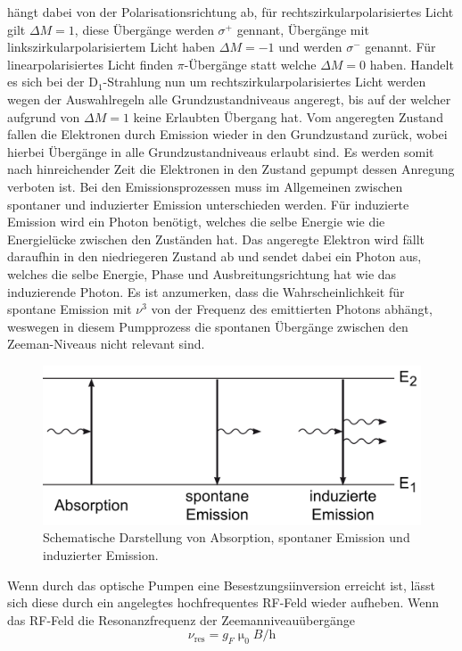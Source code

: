  hängt dabei von der Polarisationsrichtung ab, für rechtszirkularpolarisiertes Licht gilt $\Delta M=1$, diese Übergänge werden $\sigma^+$ gennant, Übergänge mit linkszirkularpolarisiertem Licht haben $\Delta M=-1$ und werden $\sigma^-$ genannt.
Für linearpolarisiertes Licht finden $\pi$-Übergänge statt welche $\Delta M=0$ haben. Handelt es sich bei der D$_1$-Strahlung nun um rechtszirkularpolarisiertes Licht werden wegen der Auswahlregeln alle Grundzustandniveaus angeregt, bis auf der welcher aufgrund von $\Delta M=1$ keine Erlaubten Übergang hat. Vom angeregten Zustand fallen die Elektronen durch Emission wieder in den Grundzustand zurück, wobei hierbei Übergänge in alle Grundzustandniveaus erlaubt sind. Es werden somit nach hinreichender Zeit die Elektronen in den Zustand gepumpt dessen Anregung verboten ist.
Bei den Emissionsprozessen muss im Allgemeinen zwischen spontaner und induzierter Emission unterschieden werden. Für induzierte Emission wird ein Photon benötigt, welches die selbe Energie wie die Energielücke zwischen den Zuständen hat. Das angeregte Elektron wird fällt daraufhin in den niedriegeren Zustand ab und sendet dabei ein Photon aus, welches die selbe Energie, Phase und Ausbreitungsrichtung hat wie das induzierende Photon.
Es ist anzumerken, dass die Wahrscheinlichkeit für spontane Emission mit $\nu^3$ von der Frequenz des emittierten Photons abhängt, weswegen in diesem Pumpprozess die spontanen Übergänge zwischen den Zeeman-Niveaus nicht relevant sind.
\begin{figure}
  \centering
  \includegraphics[scale=0.5]{Bilder/Emission}
  \caption{Schematische Darstellung von Absorption, spontaner Emission und induzierter Emission.\cite{Emission}}
\end{figure}
Wenn durch das optische Pumpen eine Besestzungsiinversion erreicht ist, lässt sich diese durch ein angelegtes hochfrequentes RF-Feld wieder aufheben. Wenn das RF-Feld die Resonanzfrequenz der Zeemanniveauübergänge
\begin{equation}
  \nu_{\text{res}}=g_F\upmu_0B/\text{h}
\end{equation}
